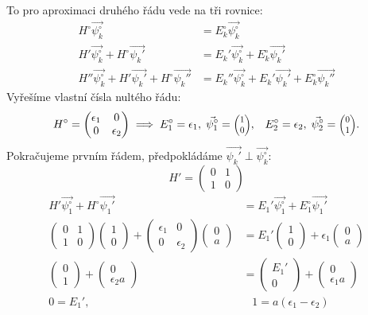 \documentclass[10pt,a4paper]{article}
\def\ph{\phantom}
\newcommand{\mat}[1]{
    \begin{pmatrix}
        #1
    \end{pmatrix}
}
\newcommand{\smat}[2][1]{
    \scalebox{#1}{$\mat{#2}$}
}
\begin{document}
To pro aproximaci druhého řádu vede na tři rovnice:
\begin{align*}
    H^{\circ} \vec{\psi_k^{\circ}} &= E^{\circ}_k \vec{\psi_k^{\circ}}
    \\[5pt]
    H' \vec{\psi_k^{\circ}} + H^{\circ} \vec{\psi_k'} &= E_k' \vec{\psi_k^{\circ}} + E^{\circ}_k \vec{\psi_k'}
    \\[5pt]
    H'' \vec{\psi_k^{\circ}} + H' \vec{\psi_k'} + H^{\circ} \vec{\psi_k''} &= E_k'' \vec{\psi_k^{\circ}} + E_k' \vec{\psi_k'} + E^{\circ}_k \vec{\psi_k''}
\end{align*}
Vyřešíme vlastní čísla nultého řádu:
\begin{align*}
    H^{\circ} = \mat{ \epsilon_1 & 0 \\ 0 & \epsilon_2 }
    \implies
    E^{\circ}_1 = \epsilon_1, \;
    \vec{\psi_1^{\circ}} = \smat[0.8]{1\\0},
    \;\;\;
    E^{\circ}_2 = \epsilon_2, \;
    \vec{\psi_2^{\circ}} = \smat[0.8]{0\\1}.
\end{align*}
Pokračujeme prvním řádem, předpokládáme $\vec{\psi_k'} \perp \vec{\psi^{\circ}_k}$:
\begin{equation*}
    H' = \mat{0&1\\1&0}
\end{equation*}
\begin{align*}
    H' \vec{\psi_1^{\circ}} + H^{\circ} \vec{\psi_1'} &= E_1' \vec{\psi_1^{\circ}} + E^{\circ}_1 \vec{\psi_1'}
    \\[5pt]
    \mat{0&1\\1&0} \mat{1\\0} +
    \mat{\epsilon_1&0\\0&\epsilon_2}\mat{0\\a}
    &=
    E_1'\mat{1\\0} + \epsilon_1\mat{0\\a}
    \\[5pt]
    \mat{0\\1} + \mat{0\\\epsilon_2 a}
    &=
    \mat{E_1'\\0}+ \mat{0\\\epsilon_1 a}
    \\[5pt]
    0 = E_1', \;\;\; &\ph{} \;\;\; 1 = a(\epsilon_1 - \epsilon_2)
\end{align*}
\end{document}
